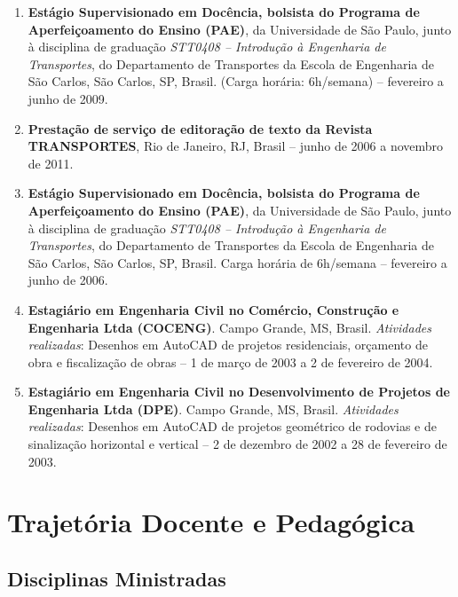 \documentclass[
  brazilian,
  11pt,
  a4paper,
]{article}
\begin{document}
\begin{enumerate}
{  ``Júlio de Mesquita Filho'', Faculdade de Engenharia de Bauru (FEB)}.
  Bauru, SP, Brasil. \emph{Atividades realizadas}: Ministrei duas
  disciplinas do curso da graduação em Engenharia Civil: ``\emph{Técnica
  e Economia dos Transportes}'' no 1º semestre; e ``\emph{Engenharia de
  Tráfego}'' no 2º semestre. (Carga horária: 12h/semana) -- 2 de março
  de 2010 a 20 de dezembro de 2010.
\item
  \textbf{Estágio Supervisionado em Docência, bolsista do Programa de
  Aperfeiçoamento do Ensino (PAE)}, da Universidade de São Paulo, junto
  à disciplina de graduação \emph{STT0408 -- Introdução à Engenharia de
  Transportes}, do Departamento de Transportes da Escola de Engenharia
  de São Carlos, São Carlos, SP, Brasil. (Carga horária: 6h/semana) --
  fevereiro a junho de 2009.
\item
  \textbf{Prestação de serviço de editoração de texto da Revista
  TRANSPORTES}, Rio de Janeiro, RJ, Brasil -- junho de 2006 a novembro
  de 2011.
\item
  \textbf{Estágio Supervisionado em Docência, bolsista do Programa de
  Aperfeiçoamento do Ensino (PAE)}, da Universidade de São Paulo, junto
  à disciplina de graduação \emph{STT0408 -- Introdução à Engenharia de
  Transportes}, do Departamento de Transportes da Escola de Engenharia
  de São Carlos, São Carlos, SP, Brasil. Carga horária de 6h/semana --
  fevereiro a junho de 2006.
\item
  \textbf{Estagiário em Engenharia Civil no Comércio, Construção e
  Engenharia Ltda (COCENG)}. Campo Grande, MS, Brasil. \emph{Atividades
  realizadas}: Desenhos em AutoCAD de projetos residenciais, orçamento
  de obra e fiscalização de obras -- 1 de março de 2003 a 2 de fevereiro
  de 2004.
\item
  \textbf{Estagiário em Engenharia Civil no Desenvolvimento de Projetos
  de Engenharia Ltda (DPE)}. Campo Grande, MS, Brasil. \emph{Atividades
  realizadas}: Desenhos em AutoCAD de projetos geométrico de rodovias e
  de sinalização horizontal e vertical -- 2 de dezembro de 2002 a 28 de
  fevereiro de 2003.
\end{enumerate}

\section{Trajetória Docente e
Pedagógica}\label{trajetuxf3ria-docente-e-pedaguxf3gica}

\subsection{Disciplinas Ministradas}\label{disciplinas-ministradas}
\end{document}
